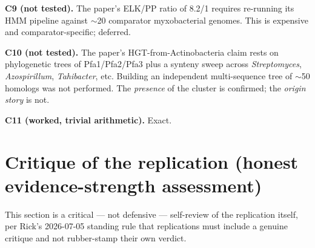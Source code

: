 \documentclass[11pt,letterpaper]{article}
\begin{document}
\textbf{C9 (not tested).} The paper's ELK/PP ratio of 8.2/1 requires re-running its HMM pipeline against $\sim$20 comparator myxobacterial genomes. This is expensive and comparator-specific; deferred.

\textbf{C10 (not tested).} The paper's HGT-from-Actinobacteria claim rests on phylogenetic trees of Pfa1/Pfa2/Pfa3 plus a synteny sweep across \emph{Streptomyces}, \emph{Azospirillum}, \emph{Tahibacter}, etc. Building an independent multi-sequence tree of $\sim$50 homologs was not performed. The \emph{presence} of the cluster is confirmed; the \emph{origin story} is not.

\textbf{C11 (worked, trivial arithmetic).} Exact.

\section{Critique of the replication (honest evidence-strength assessment)}

This section is a critical --- not defensive --- self-review of the replication itself, per Rick's 2026-07-05 standing rule that replications must include a genuine critique and not rubber-stamp their own verdict.
\end{document}
